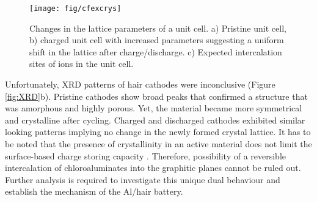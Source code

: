 \documentclass{article}
\begin{document}
\begin{figure}%
  \centering
  \texttt{[image: fig/cfexcrys]}
    \caption{Changes in the lattice parameters of a  unit cell. a) Pristine  unit cell, b) charged  unit cell with increased parameters suggesting a uniform shift in the lattice after charge/discharge. c) Expected intercalation sites of  ions in the unit cell.}
  \label{fig:cfexcrys}
\end{figure}

Unfortunately, XRD patterns of hair cathodes were inconclusive (Figure \ref{fig:XRD}b). Pristine cathodes show broad peaks that confirmed a structure that was amorphous and highly porous. Yet, the material became more symmetrical and crystalline after cycling. Charged and discharged cathodes exhibited similar looking patterns implying no change in the newly formed crystal lattice. It has to be noted that the presence of crystallinity in an active material does not limit the surface-based charge storing capacity \cite{kim_synthesis_2006, jow_factors_2018}. Therefore, possibility of a reversible intercalation of chloroaluminates into the graphitic planes cannot be ruled out. Further analysis is required to investigate this unique dual behaviour and establish the mechanism of the Al/hair battery.
\end{document}
